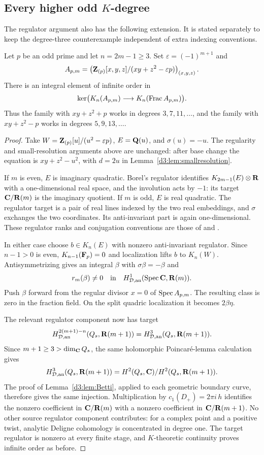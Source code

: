 \subsection{Every higher odd $K$-degree}

The regulator argument also has the following extension. It is stated separately to keep the degree-three counterexample independent of extra indexing conventions.

\begin{proposition}\label{d3:prop:odddegrees}
Let $p$ be an odd prime and let $n=2m-1\geq3$. Set $\varepsilon=(-1)^{m+1}$ and
\[
A_{p,m}=\left(\mathbf Z_{(p)}[x,y,z]/(xy+z^2-\varepsilon p)\right)_{(x,y,z)}.
\]
There is an integral element of infinite order in
\[
\ker\bigl(K_n(A_{p,m})\longrightarrow K_n(\operatorname{Frac} A_{p,m})\bigr).
\]
Thus the family with $xy+z^2+p$ works in degrees $3,7,11,\ldots$, and the family with $xy+z^2-p$ works in degrees $5,9,13,\ldots$.
\end{proposition}
\begin{proof}
Take $W=\mathbf Z_{(p)}[u]/(u^2-\varepsilon p)$, $E=\mathbf Q(u)$, and $\sigma(u)=-u$. The regularity and small-resolution arguments above are unchanged: after base change the equation is $xy+z^2-u^2$, with $d=2u$ in Lemma~\ref{d3:lem:smallresolution}.

If $m$ is even, $E$ is imaginary quadratic. Borel's regulator identifies $K_{2m-1}(E)\otimes\mathbf R$ with a one-dimensional real space, and the involution acts by $-1$: its target $\mathbf C/\mathbf R(m)$ is the imaginary quotient. If $m$ is odd, $E$ is real quadratic. The regulator target is a pair of real lines indexed by the two real embeddings, and $\sigma$ exchanges the two coordinates. Its anti-invariant part is again one-dimensional. These regulator ranks and conjugation conventions are those of \cite[Proposition~12.2]{Borel} and \cite[Section~6]{BunkeTamme}.

In either case choose $b\in K_n(E)$ with nonzero anti-invariant regulator. Since $n-1>0$ is even, $K_{n-1}(\mathbf F_p)=0$ and localization lifts $b$ to $K_n(W)$. Antisymmetrizing gives an integral $\beta$ with $\sigma\beta=-\beta$ and
\[
r_m(\beta)\neq0\quad\text{in}\quad H_{\mathcal D,\mathrm{an}}^1(\operatorname{Spec}\mathbf C,\mathbf R(m)).
\]
Push $\beta$ forward from the regular divisor $x=0$ of $\operatorname{Spec} A_{p,m}$. The resulting class is zero in the fraction field. On the split quadric localization it becomes $2\beta\eta$.

The relevant regulator component now has target
\[
H_{\mathcal D,\mathrm{an}}^{2(m+1)-n}(Q_s,\mathbf R(m+1))
=H_{\mathcal D,\mathrm{an}}^3(Q_s,\mathbf R(m+1)).
\]
Since $m+1\geq3>\dim_{\mathbf C}Q_s$, the same holomorphic Poincar\'e-lemma calculation gives
\[
H_{\mathcal D,\mathrm{an}}^3(Q_s,\mathbf R(m+1))
=H^2(Q_s,\mathbf C)/H^2(Q_s,\mathbf R(m+1)).
\]
The proof of Lemma~\ref{d3:lem:Betti}, applied to each geometric boundary curve, therefore gives the same injection. Multiplication by $c_1(D_+)=2\pi i\,h$ identifies the nonzero coefficient in $\mathbf C/\mathbf R(m)$ with a nonzero coefficient in $\mathbf C/\mathbf R(m+1)$. No other source regulator component contributes: for a complex point and a positive twist, analytic Deligne cohomology is concentrated in degree one. The target regulator is nonzero at every finite stage, and $K$-theoretic continuity proves infinite order as before.
\end{proof}

